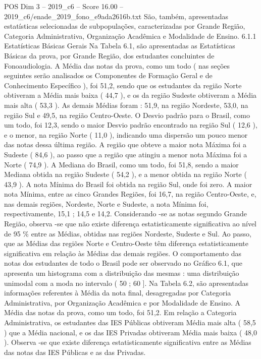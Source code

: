 \begin{textsample}{POS Dim 3 – 2019\_c6 – Score 16.00 – 2019\_c6/enade\_2019\_fono\_e9ada2616b.txt}
São, também, apresentadas estatísticas selecionadas de subpopulações, caracterizadas por Grande Região, Categoria Administrativa, Organização Acadêmica e Modalidade de Ensino. 6.1.1 Estatísticas Básicas Gerais Na Tabela 6.1, são apresentadas as Estatísticas Básicas da prova, por Grande Região, dos estudantes concluintes de Fonoaudiologia.
A Média das notas da prova, como um todo ( nas seções seguintes serão analisados os Componentes de Formação Geral e de Conhecimento Específico ), foi 51,2, sendo que os estudantes da região Norte obtiveram a Média mais baixa ( 44,7 ), e os da região Sudeste obtiveram a Média mais alta ( 53,3 ).
As demais Médias foram : 51,9, na região Nordeste, 53,0, na região Sul e 49,5, na região Centro-Oeste.
O Desvio padrão para o Brasil, como um todo, foi 12,3, sendo o maior Desvio padrão encontrado na região Sul ( 12,6 ), e o menor, na região Norte ( 11,0 ), indicando uma dispersão um pouco menor das notas dessa última região.
A região que obteve a maior nota Máxima foi a Sudeste ( 84,6 ), ao passo que a região que atingiu a menor nota Máxima foi a Norte ( 74,9 ).
A Mediana do Brasil, como um todo, foi 51,8, sendo a maior Mediana obtida na região Sudeste ( 54,2 ), e a menor obtida na região Norte ( 43,9 ).
A nota Mínima do Brasil foi obtida na região Sul, onde foi zero.
A maior nota Mínima, entre as cinco Grandes Regiões, foi 16,7, na região Centro-Oeste, e, nas demais regiões, Nordeste, Norte e Sudeste, a nota Mínima foi, respectivamente, 15,1 ; 14,5 e 14,2.
Considerando -se as notas segundo Grande Região, observa -se que não existe diferença estatisticamente significativa ao nível de 95 \% entre as Médias, obtidas nas regiões Nordeste, Sudeste e Sul.
Ao passo, que as Médias das regiões Norte e Centro-Oeste têm diferença estatisticamente significativa em relação às Médias das demais regiões.
O comportamento das notas dos estudantes de todo o Brasil pode ser observado no Gráfico 6.1, que apresenta um histograma com a distribuição das mesmas : uma distribuição unimodal com a moda no intervalo ( 50 ; 60 ].
Na Tabela 6.2, são apresentadas informações referentes à Média da nota final, desagregadas por Categoria Administrativa, por Organização Acadêmica e por Modalidade de Ensino.
A Média das notas da prova, como um todo, foi 51,2.
Em relação a Categoria Administrativa, os estudantes das IES Públicas obtiveram Média mais alta ( 58,5 ) que a Média nacional, e os das IES Privadas obtiveram Média mais baixa ( 48,0 ).
Observa -se que existe diferença estatisticamente significativa entre as Médias das notas das IES Públicas e as das Privadas.

\end{textsample}
